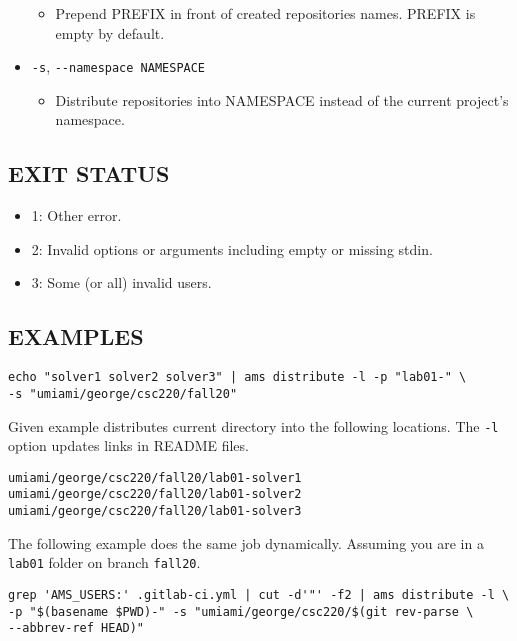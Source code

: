 \begin{itemize}
  \begin{itemize}
  \item
    Prepend PREFIX in front of created repositories names. PREFIX is empty by default.
  \end{itemize}
\item
  \texttt{-s}, \texttt{-\/-namespace\ NAMESPACE}

  \begin{itemize}
  \item
    Distribute repositories into NAMESPACE instead of the current project's namespace.
  \end{itemize}
\end{itemize}

\subsection{EXIT STATUS}\label{exit-status-2}

\begin{itemize}
\item
  1: Other error.
\item
  2: Invalid options or arguments including empty or missing stdin.
\item
  3: Some (or all) invalid users.
\end{itemize}

\subsection{EXAMPLES}\label{examples-2}

\begin{verbatim}
echo "solver1 solver2 solver3" | ams distribute -l -p "lab01-" \ 
-s "umiami/george/csc220/fall20"
\end{verbatim}

Given example distributes current directory into the following locations. The \texttt{-l} option updates links in README files.

\begin{verbatim}
umiami/george/csc220/fall20/lab01-solver1
umiami/george/csc220/fall20/lab01-solver2
umiami/george/csc220/fall20/lab01-solver3
\end{verbatim}

The following example does the same job dynamically. Assuming you are in a \texttt{lab01} folder on branch \texttt{fall20}.

\begin{verbatim}
grep 'AMS_USERS:' .gitlab-ci.yml | cut -d'"' -f2 | ams distribute -l \
-p "$(basename $PWD)-" -s "umiami/george/csc220/$(git rev-parse \
--abbrev-ref HEAD)"
\end{verbatim}

